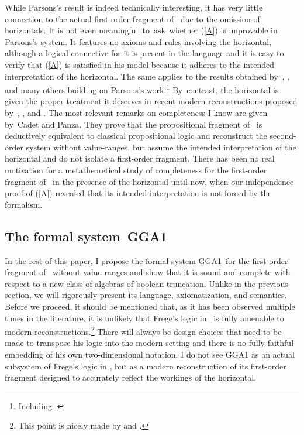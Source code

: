 \documentclass{preprint}
\newcommand{\GGA}{\textsf{GGA1}}
\begin{document}
While Parsons's result is indeed technically interesting, 
it has very little connection to the actual first-order fragment of \gga~due to the omission of horizontals. It is not even meaningful~to~ask~whether (\ref{A}) is unprovable in Parsons's system. It features no axioms and rules involving the horizontal, although a logical connective for it is present in the language and it is easy to verify that (\ref{A}) is satisfied in his model because it adheres to the intended interpretation of the horizontal. The same applies to the results obtained by~\cite{heck1996consistency}, \cite{burgess1998consistent}, and many others building on Parsons's work.\footnote{
	Including \cite{wehmeier1999consistent,ferreira2002consistency, Ferreira2005amending, walsh2016frege}.}  
%
By~contrast, the horizontal is given the proper treatment it deserves in recent modern reconstructions proposed by~\cite{klement2002frege}, \cite{landini2012frege}, and \cite{cadetpanza2015logical}. %
The most relevant remarks on completeness I know are given by~Cadet and Panza. 
They prove that the propositional fragment of \gga~is deductively equivalent to classical propositional logic and reconstruct the second-order system without value-ranges, but assume the intended interpretation of the horizontal and do not isolate a first-order fragment. There has been no real motivation for a metatheoretical study of completeness for the first-order fragment of \gga~in the presence of the horizontal until now, when our independence proof of (\ref{A}) revealed that its intended interpretation is not forced by the formalism.

\subsection{The formal system~\GGA} \label{systemgga1}

In the rest of this paper, I propose the formal system \GGA~for the first-order fragment of \gga~without value-ranges and show that it is sound and complete with respect to a new class of algebras of boolean truncation. Unlike in the previous section, we will rigorously present its language, axiomatization, and semantics. Before we proceed, it should be mentioned that, as it has been observed multiple times in the literature, it is unlikely that Frege's logic in \gga~is fully amenable to modern reconstructions.\footnote{
	This point is nicely made by \citet{cadetpanza2015logical} and \citet{sep-frege-logic}. } 
There will always be design choices that need to be made to transpose his logic into the modern setting and there is no fully faithful embedding of his own two-dimensional notation. 
I do not see {\GGA} as an actual subsystem of Frege's logic in \gga, but as a modern reconstruction of its first-order fragment designed to accurately reflect the workings of the horizontal. 
\end{document}
